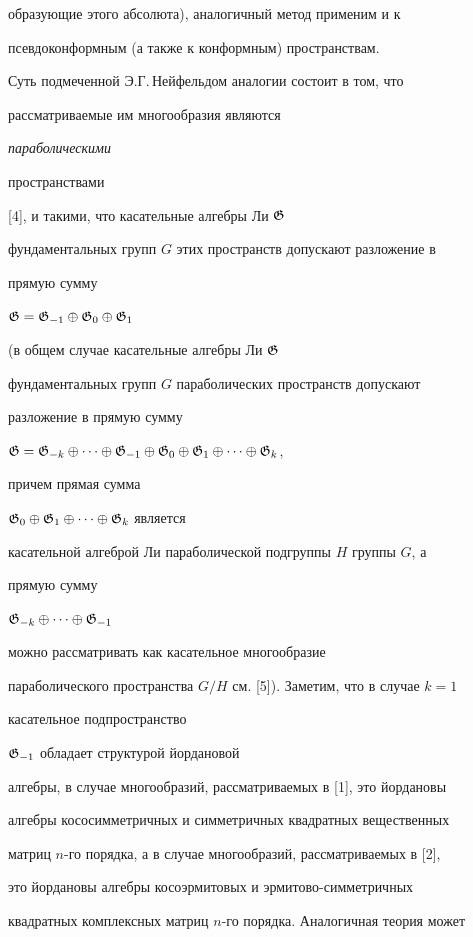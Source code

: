 образующие этого абсолюта), аналогичный метод применим и к


псевдоконформным (а также к конформным) пространствам.


\medskip





Суть подмеченной Э.Г.\,Нейфельдом аналогии состоит в том, что


рассматриваемые им многообразия являются {\it параболическими


пространствами} [4], и такими, что касательные алгебры Ли $\frak G$


фундаментальных групп $G$ этих пространств допускают разложение в


прямую сумму


$\frak G=\frak G_{-1}\oplus\frak G_0\oplus\frak G_1$


(в общем случае касательные алгебры Ли $\frak G$


фундаментальных групп $G$ параболических пространств допускают


разложение в прямую сумму


$\frak G=\frak G_{-k}\oplus\dotsb\oplus\frak G_{-1}


\oplus\frak G_0\oplus\frak G_1\oplus\dotsb\oplus\frak G_k$,


причем прямая сумма


$\frak G_0\oplus\frak G_1\oplus\dotsb\oplus\frak G_k$ является


касательной алгеброй Ли параболической подгруппы $H$ группы $G$, а


прямую сумму


$\frak G_{-k}\oplus\dotsb\oplus\frak G_{-1}$


можно рассматривать как касательное многообразие


параболического пространства $G/H$ см. [5]). Заметим, что в случае $k=1$


касательное подпространство


$\frak G_{-1}$ обладает структурой йордановой


алгебры, в случае многообразий, рассматриваемых в [1], это йордановы


алгебры кососимметричных и симметричных квадратных вещественных


матриц $n$-го порядка, а в случае многообразий, рассматриваемых в [2],


это йордановы алгебры косоэрмитовых и эрмитово-симметричных


квадратных комплексных матриц $n$-го порядка. Аналогичная теория может


